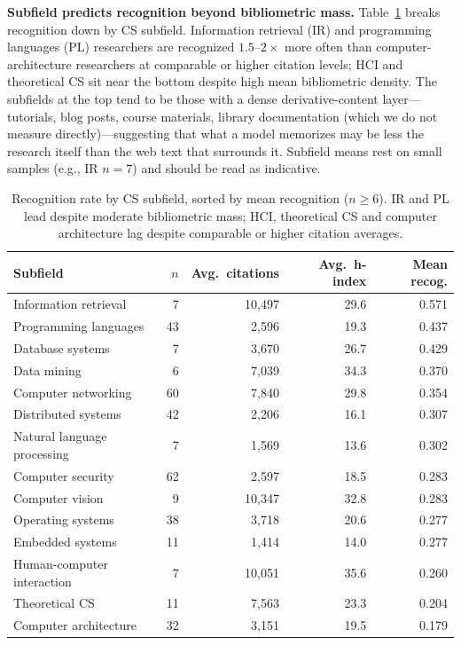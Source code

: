 \documentclass[11pt]{article}
\begin{document}
\textbf{Subfield predicts recognition beyond bibliometric mass.} Table~\ref{tab:recog-by-field} breaks recognition down by CS subfield. Information retrieval (IR) and programming languages (PL) researchers are recognized $1.5$--$2\times$ more often than computer-architecture researchers at comparable or higher citation levels; HCI and theoretical CS sit near the bottom despite high mean bibliometric density. The subfields at the top tend to be those with a dense derivative-content layer---tutorials, blog posts, course materials, library documentation (which we do not measure directly)---suggesting that what a model memorizes may be less the research itself than the web text that surrounds it. Subfield means rest on small samples (e.g., IR $n=7$) and should be read as indicative.

\begin{table}[H]
\centering
\small
\caption{Recognition rate by CS subfield, sorted by mean recognition ($n \geq 6$). IR and PL lead despite moderate bibliometric mass; HCI, theoretical CS and computer architecture lag despite comparable or higher citation averages.}
\label{tab:recog-by-field}
\begin{tabular}{lrrrr}
\toprule
Subfield & $n$ & Avg.\ citations & Avg.\ h-index & Mean recog. \\
\midrule
Information retrieval         & 7  & 10{,}497 & 29.6 & 0.571 \\
Programming languages         & 43 & 2{,}596  & 19.3 & 0.437 \\
Database systems              & 7  & 3{,}670  & 26.7 & 0.429 \\
Data mining                   & 6  & 7{,}039  & 34.3 & 0.370 \\
Computer networking           & 60 & 7{,}840  & 29.8 & 0.354 \\
Distributed systems           & 42 & 2{,}206  & 16.1 & 0.307 \\
Natural language processing   & 7  & 1{,}569  & 13.6 & 0.302 \\
Computer security             & 62 & 2{,}597  & 18.5 & 0.283 \\
Computer vision               & 9  & 10{,}347 & 32.8 & 0.283 \\
Operating systems             & 38 & 3{,}718  & 20.6 & 0.277 \\
Embedded systems              & 11 & 1{,}414  & 14.0 & 0.277 \\
Human-computer interaction    & 7  & 10{,}051 & 35.6 & 0.260 \\
Theoretical CS                & 11 & 7{,}563  & 23.3 & 0.204 \\
Computer architecture         & 32 & 3{,}151  & 19.5 & 0.179 \\
\bottomrule
\end{tabular}
\end{table}
\end{document}
